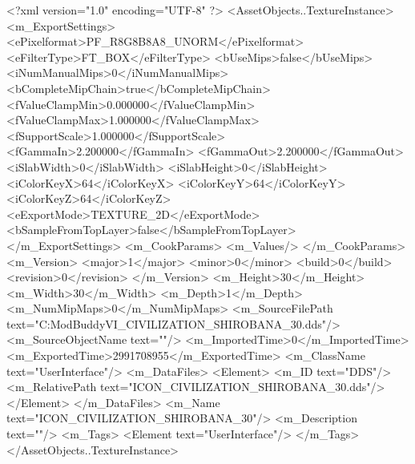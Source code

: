<?xml version="1.0" encoding="UTF-8" ?>
<AssetObjects..TextureInstance>
	<m_ExportSettings>
		<ePixelformat>PF_R8G8B8A8_UNORM</ePixelformat>
		<eFilterType>FT_BOX</eFilterType>
		<bUseMips>false</bUseMips>
		<iNumManualMips>0</iNumManualMips>
		<bCompleteMipChain>true</bCompleteMipChain>
		<fValueClampMin>0.000000</fValueClampMin>
		<fValueClampMax>1.000000</fValueClampMax>
		<fSupportScale>1.000000</fSupportScale>
		<fGammaIn>2.200000</fGammaIn>
		<fGammaOut>2.200000</fGammaOut>
		<iSlabWidth>0</iSlabWidth>
		<iSlabHeight>0</iSlabHeight>
		<iColorKeyX>64</iColorKeyX>
		<iColorKeyY>64</iColorKeyY>
		<iColorKeyZ>64</iColorKeyZ>
		<eExportMode>TEXTURE_2D</eExportMode>
		<bSampleFromTopLayer>false</bSampleFromTopLayer>
	</m_ExportSettings>
	<m_CookParams>
		<m_Values/>
	</m_CookParams>
	<m_Version>
		<major>1</major>
		<minor>0</minor>
		<build>0</build>
		<revision>0</revision>
	</m_Version>
	<m_Height>30</m_Height>
	<m_Width>30</m_Width>
	<m_Depth>1</m_Depth>
	<m_NumMipMaps>0</m_NumMipMaps>
	<m_SourceFilePath text="C:\Users\asus\Documents\Firaxis ModBuddy\Civilization VI\temppic\ICON_CIVILIZATION_SHIROBANA_30.dds"/>
	<m_SourceObjectName text=""/>
	<m_ImportedTime>0</m_ImportedTime>
	<m_ExportedTime>2991708955</m_ExportedTime>
	<m_ClassName text="UserInterface"/>
	<m_DataFiles>
		<Element>
			<m_ID text="DDS"/>
			<m_RelativePath text="ICON_CIVILIZATION_SHIROBANA_30.dds"/>
		</Element>
	</m_DataFiles>
	<m_Name text="ICON_CIVILIZATION_SHIROBANA_30"/>
	<m_Description text=""/>
	<m_Tags>
		<Element text="UserInterface"/>
	</m_Tags>
</AssetObjects..TextureInstance>

